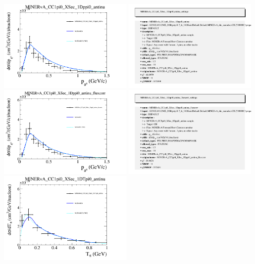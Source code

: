 \documentclass{article}
\begin{document}
\centering
\includegraphics[width=0.49\textwidth]{figures/nuisance_MINERvA_CC1pi0_XSec_1Dppi0_antinu_comp.png}
\includegraphics[width=0.49\textwidth]{figures/nuisance_MINERvA_CC1pi0_XSec_1Dppi0_antinu_info.png}
\centering
\includegraphics[width=0.49\textwidth]{figures/nuisance_MINERvA_CC1pi0_XSec_1Dppi0_antinu_fluxcorr_comp.png}
\includegraphics[width=0.49\textwidth]{figures/nuisance_MINERvA_CC1pi0_XSec_1Dppi0_antinu_fluxcorr_info.png}
\centering
\includegraphics[width=0.49\textwidth]{figures/nuisance_MINERvA_CC1pi0_XSec_1DTpi0_antinu_comp.png}
\end{document}
